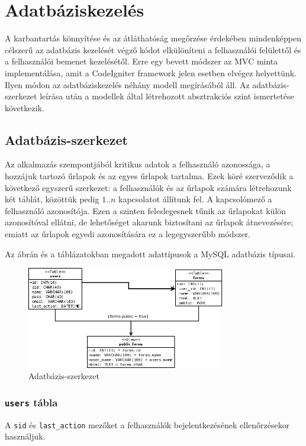 \documentclass[12pt,a4paper,twoside]{article}
\begin{document}
\section{Adatbáziskezelés}

A karbantartás könnyítése és az átláthatóság megőrzése érdekében mindenképpen
célszerű az adatbázis kezelését végző kódot elkülöníteni a felhasználói
felülettől és a felhasználói bemenet kezelésétől. Erre egy bevett módszer az
MVC\cite{MVC} minta implementálása, amit a CodeIgniter framework jelen esetben
elvégez helyettünk. Ilyen módon az adatbáziskezelés néhány modell megírásából
áll. Az adatbázis-szerkezet leírása után a modellek által létrehozott
absztrakciós szint ismertetése következik.

\subsection{Adatbázis-szerkezet}

Az alkalmazás szempontjából kritikus adatok a felhasználó azonossága, a hozzájuk
tartozó űrlapok és az egyes űrlapok tartalma. Ezek köré szerveződik a következő egyszerű
szerkezet: a felhasználók és az űrlapok számára létrehozunk két táblát, közöttük
pedig $1..n$ kapcsolatot állítunk fel. A kapcsolómező a felhasználó
azonosítója. Ezen a szinten feleslegesnek tűnik az űrlapokat külön
azonosítóval ellátni, de lehetőséget akarunk biztosítani az űrlapok
átnevezésére; emiatt az űrlapok egyedi azonosítására ez a legegyszerűbb módszer.

Az ábrán és a táblázatokban megadott adattípusok a MySQL adatbázis típusai.

\begin{figure}[H]
  \centering
  \includegraphics[width=328px]{db.png}
  \caption{Adatbázis-szerkezet}\label{fig:db}
\end{figure}

\subsubsection{\texttt{users} tábla}
A \texttt{sid} és \texttt{last\_action} mezőket a felhasználók bejelentkezésének
ellenőrzésekor használjuk.
\end{document}
